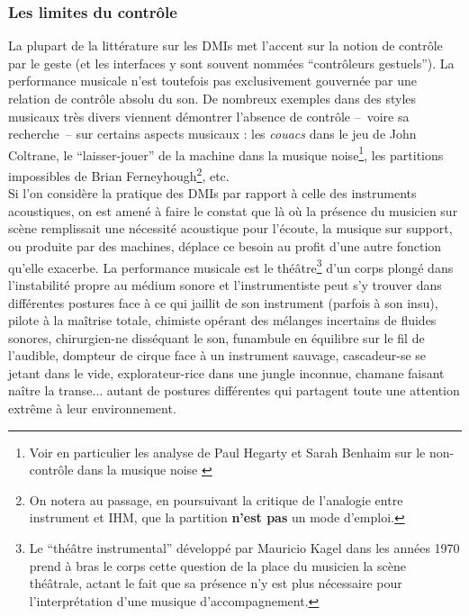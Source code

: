 \subsubsection{Les limites du contrôle}

\noindent La plupart de la littérature sur les \glspl{DMI} met l'accent sur la notion de contrôle par le geste (et les interfaces y sont souvent nommées ``contrôleurs gestuels''). La performance musicale n'est toutefois pas exclusivement gouvernée par une relation de contrôle absolu du son. De nombreux exemples dans des styles musicaux très divers viennent démontrer l'absence de contrôle --~voire sa recherche~-- sur certains aspects musicaux : les \textit{couacs} dans le jeu de John Coltrane, le ``laisser-jouer'' de la machine dans la musique noise\footnote{Voir en particulier les analyse de Paul Hegarty et Sarah Benhaim sur le non-contrôle dans la musique noise \cite{hegarty_noise_2007, benhaim_aux_2018}}, les partitions impossibles de Brian Ferneyhough\footnote{On notera au passage, en poursuivant la critique de l'analogie entre instrument et \gls{IHM}, que la partition \textbf{n'est pas} un mode d'emploi.}, etc.\\
\indent Si l'on considère la pratique des \glspl{DMI} par rapport à celle des instruments acoustiques, on est amené à faire le constat que là où la présence du musicien sur scène remplissait une nécessité acoustique pour l’écoute, la musique sur support, ou produite par des machines, déplace ce besoin au profit d’une autre fonction qu'elle exacerbe. La performance musicale est le théâtre\footnote{Le ``théâtre instrumental'' développé par Mauricio Kagel dans les années 1970 prend à bras le corps cette question de la place du musicien la scène théâtrale, actant le fait que sa présence n'y est plus nécessaire pour l'interprétation d'une musique d'accompagnement.} d'un corps plongé dans l'instabilité propre au médium sonore et l'instrumentiste peut s'y trouver dans différentes postures face à ce qui jaillit de son instrument (parfois à son insu), pilote à la maîtrise totale, chimiste opérant des mélanges incertains de fluides sonores, chirurgien-ne disséquant le son, funambule en équilibre sur le fil de l'audible, dompteur de cirque face à un instrument sauvage, cascadeur-se se jetant dans le vide, explorateur-rice dans une jungle inconnue, chamane faisant naître la transe... autant de postures différentes qui partagent toute une attention extrême à leur environnement.

